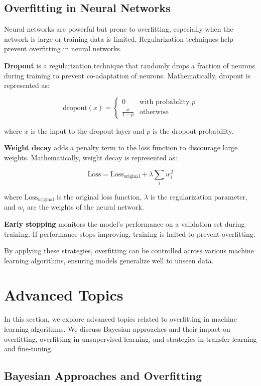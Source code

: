 \documentclass[12pt]{book} %
\begin{document}
\subsection{Overfitting in Neural Networks}

Neural networks are powerful but prone to overfitting, especially when the network is large or training data is limited. Regularization techniques help prevent overfitting in neural networks.

\textbf{Dropout} is a regularization technique that randomly drops a fraction of neurons during training to prevent co-adaptation of neurons. Mathematically, dropout is represented as:

\[
\text{dropout}(x) = \begin{cases} 
0 & \text{with probability } p \\
\frac{x}{1 - p} & \text{otherwise}
\end{cases}
\]

where \( x \) is the input to the dropout layer and \( p \) is the dropout probability.

\textbf{Weight decay} adds a penalty term to the loss function to discourage large weights. Mathematically, weight decay is represented as:

\[
\text{Loss} = \text{Loss}_{\text{original}} + \lambda \sum_{i} w_i^2
\]

where \( \text{Loss}_{\text{original}} \) is the original loss function, \( \lambda \) is the regularization parameter, and \( w_i \) are the weights of the neural network.

\textbf{Early stopping} monitors the model's performance on a validation set during training. If performance stops improving, training is halted to prevent overfitting.

By applying these strategies, overfitting can be controlled across various machine learning algorithms, ensuring models generalize well to unseen data.


\section{Advanced Topics}

In this section, we explore advanced topics related to overfitting in machine learning algorithms. We discuss Bayesian approaches and their impact on overfitting, overfitting in unsupervised learning, and strategies in transfer learning and fine-tuning.

\subsection{Bayesian Approaches and Overfitting}
\end{document}
